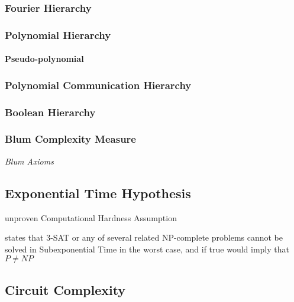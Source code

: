 \subsubsection{Fourier Hierarchy}

\subsubsection{Polynomial Hierarchy}

\paragraph{Pseudo-polynomial}\label{sec:pseudo_polynomial}\hfill

\subsubsection{Polynomial Communication Hierarchy}

\subsubsection{Boolean Hierarchy}




\subsubsection{Blum Complexity Measure}

\emph{Blum Axioms}



\subsection{Exponential Time Hypothesis}\label{sec:exponential_time_hypothesis}

unproven Computational Hardness Assumption

states that 3-SAT or any of several related NP-complete problems cannot be
solved in Subexponential Time in the worst case, and if true would imply that
$P \neq NP$



\subsection{Circuit Complexity}\label{sec:circuit_complexity}

